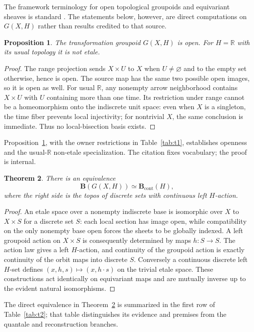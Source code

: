 \documentclass[12pt]{article}
\newtheorem{theorem}{Theorem}[section]
\newtheorem{proposition}[theorem]{Proposition}
\theoremstyle{definition}
\newcommand{\B}{\mathbf B}
\newcommand{\R}{\mathbb R}
\begin{document}
The framework terminology for open topological groupoids and equivariant sheaves is standard \cite[Section~2.1, journal pp.~542--543]{forssell2013}.  The statements below, however, are direct computations on $G(X,H)$ rather than results credited to that source.

\begin{proposition}\label{prop:open}
The transformation groupoid $G(X,H)$ is open.  For $H=\R$ with its usual topology it is not etale.
\end{proposition}
\begin{proof}
The range projection sends $X\times U$ to $X$ when $U\ne\varnothing$ and to the empty set otherwise, hence is open.  The source map has the same two possible open images, so it is open as well.  For usual $\R$, any nonempty arrow neighborhood contains $X\times U$ with $U$ containing more than one time.  Its restriction under range cannot be a homeomorphism onto the indiscrete unit space: even when $X$ is a singleton, the time fiber prevents local injectivity; for nontrivial $X$, the same conclusion is immediate.  Thus no local-bisection basis exists.
\end{proof}
Proposition~\ref{prop:open}, with the owner restrictions in Table~\ref{tab:t1}, establishes openness and the usual-$\R$ non-etale specialization.  The citation fixes vocabulary; the proof is internal.

\begin{theorem}\label{thm:topos}
There is an equivalence
\[
 \B(G(X,H))\simeq\B_{\mathrm{cont}}(H),
\]
where the right side is the topos of discrete sets with continuous left $H$-action.
\end{theorem}
\begin{proof}
An etale space over a nonempty indiscrete base is isomorphic over $X$ to $X\times S$ for a discrete set $S$: each local section has image open, while compatibility on the only nonempty base open forces the sheets to be globally indexed.  A left groupoid action on $X\times S$ is consequently determined by maps $h:S\to S$.  The action law gives a left $H$-action, and continuity of the groupoid action is exactly continuity of the orbit maps into discrete $S$.  Conversely a continuous discrete left $H$-set defines $(x,h,s)\mapsto(x,h\cdot s)$ on the trivial etale space.  These constructions act identically on equivariant maps and are mutually inverse up to the evident natural isomorphisms.
\end{proof}
The direct equivalence in Theorem~\ref{thm:topos} is summarized in the first row of Table~\ref{tab:t2}; that table distinguishes its evidence and premises from the quantale and reconstruction branches.
\end{document}
